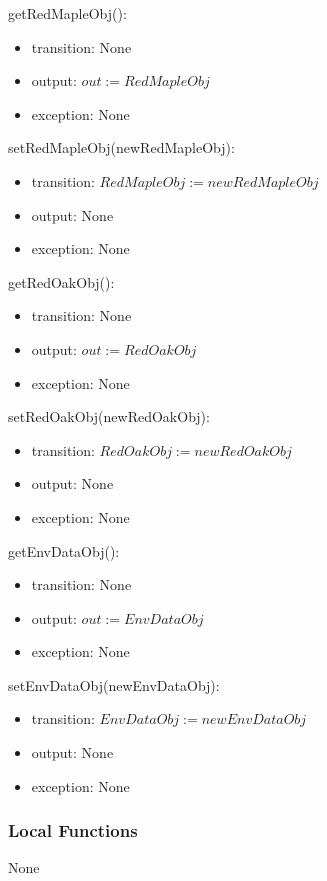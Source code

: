 \documentclass[12pt, titlepage]{article}
\begin{document}
\renewcommand{\attr}{RedMapleObj}
\noindent get\attr():
\begin{itemize}
\item transition: None
\item output: $\mathit{out := \attr}$
\item exception: None
\end{itemize}

\noindent set\attr(new\attr):
\begin{itemize}
\item transition: $\mathit{\attr := new\attr}$
\item output: None
\item exception: None
\end{itemize}


\renewcommand{\attr}{RedOakObj}
\noindent get\attr():
\begin{itemize}
\item transition: None
\item output: $\mathit{out := \attr}$
\item exception: None
\end{itemize}

\noindent set\attr(new\attr):
\begin{itemize}
\item transition: $\mathit{\attr := new\attr}$
\item output: None
\item exception: None
\end{itemize}

\newpage

\renewcommand{\attr}{EnvDataObj}
\noindent get\attr():
\begin{itemize}
\item transition: None
\item output: $\mathit{out := \attr}$
\item exception: None
\end{itemize}

\noindent set\attr(new\attr):
\begin{itemize}
\item transition: $\mathit{\attr := new\attr}$
\item output: None
\item exception: None
\end{itemize}


\subsubsection{Local Functions}
None
\end{document}
